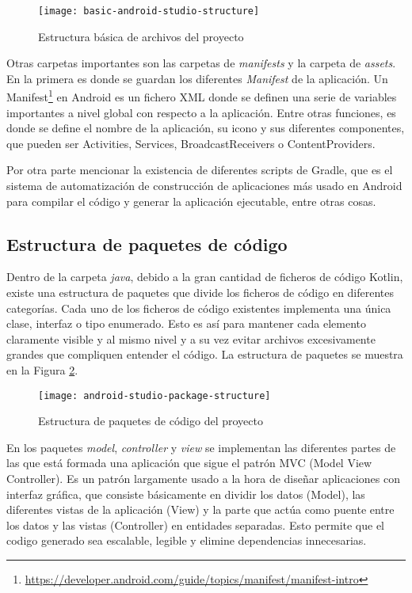 \begin{figure}[H]
	\centering
	\texttt{[image: basic-android-studio-structure]}
	\caption{Estructura básica de archivos del proyecto}
	\label{fig:basic-android-studio-structure}
\end{figure}

Otras carpetas importantes son las carpetas de \textit{manifests} y la carpeta de \textit{assets}. En la primera es donde se guardan los diferentes \textit{Manifest} de la aplicación. Un Manifest\footnote{\url{https://developer.android.com/guide/topics/manifest/manifest-intro}} en Android es un fichero XML donde se definen una serie de variables importantes a nivel global con respecto a la aplicación. Entre otras funciones, es donde se define el nombre de la aplicación, su icono y sus diferentes componentes, que pueden ser Activities, Services, BroadcastReceivers o ContentProviders.

Por otra parte mencionar la existencia de diferentes scripts de Gradle, que es el sistema de automatización de construcción de aplicaciones más usado en Android para compilar el código y generar la aplicación ejecutable, entre otras cosas.

\subsection{Estructura de paquetes de código}

Dentro de la carpeta \textit{java}, debido a la gran cantidad de ficheros de código Kotlin, existe una estructura de paquetes que divide los ficheros de código en diferentes categorías. Cada uno de los ficheros de código existentes implementa una única clase, interfaz o tipo enumerado. Esto es así para mantener cada elemento claramente visible y al mismo nivel y a su vez evitar archivos excesivamente grandes que compliquen entender el código. La estructura de paquetes se muestra en la Figura \ref{fig:android-studio-package-structure}.

\begin{figure}[H]
	\centering
	\texttt{[image: android-studio-package-structure]}
	\caption{Estructura de paquetes de código del proyecto}
	\label{fig:android-studio-package-structure}
\end{figure}

En los paquetes \textit{model}, \textit{controller} y \textit{view} se implementan las diferentes partes de las que está formada una aplicación que sigue el patrón MVC (Model View Controller). Es un patrón largamente usado a la hora de diseñar aplicaciones con interfaz gráfica, que consiste básicamente en dividir los datos (Model), las diferentes vistas de la aplicación (View) y la parte que actúa como puente entre los datos y las vistas (Controller) en entidades separadas. Esto permite que el codigo generado sea escalable, legible y elimine dependencias innecesarias. 

